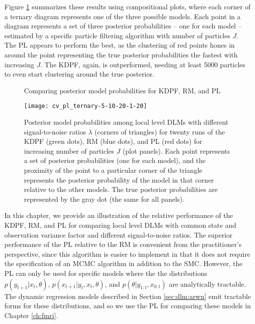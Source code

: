 Figure \ref{fig:comp:post} summarizes these results using compositional plots, where each corner of a ternary diagram represents one of the three possible models. Each point in a diagram represents a set of three posterior probabilities -- one for each model -- estimated by a specific particle filtering algorithm with number of particles $J$. The PL appears to perform the best, as the clustering of red points hones in around the point representing the true posterior probabilities the fastest with increasing $J$. The KDPF, again, is outperformed, needing at least 5000 particles to even start clustering around the true posterior.

\begin{figure}[ht]
\ssp
\centering
\caption{Comparing posterior model probabilities for KDPF, RM, and PL} \label{fig:comp:post}
\texttt{[image: cv\_pl\_ternary-5-10-20-1-20]}
\caption*{Posterior model probabilities among local level DLMs with different signal-to-noise ratios $\lambda$ (corners of triangles) for twenty runs of the KDPF (green dots), RM (blue dots), and PL (red dots) for increasing number of particles $J$ (plot panels). Each point represents a set of posterior probabilities (one for each model), and the proximity of the point to a particular corner of the triangle represents the posterior probability of the model in that corner relative to the other models. The true posterior probabilities are represented by the gray dot (the same for all panels).}
\end{figure}

In this chapter, we provide an illustration of the relative performance of the KDPF, RM, and PL for comparing local level DLMs with common state and observation variance factor and different signal-to-noise ratios. The superior performance of the PL relative to the RM is convenient from the practitioner's perspective, since this algorithm is easier to implement in that it does not require the specification of an MCMC algorithm in addition to the SMC. However, the PL can only be used for specific models where the the distributions $p(y_{t+1}|x_t,\theta)$, $p(x_{t+1}|y_t,x_t,\theta)$, and $p(\theta|y_{1:t},x_{0:t})$ are analytically tractable. The dynamic regression models described in Section \ref{sec:dlm:arwn} emit tractable forms for these distributions, and so we use the PL for comparing these models in Chapter \ref{ch:fmri}. 